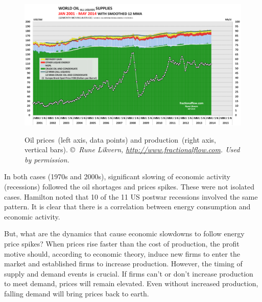 \begin{figure}[!ht]
\centering\
\includegraphics[width=\linewidth]{Part_0/Chapter_Introduction/images/WORLD_ALL_LIQUIDS_MAY_2014.png}
\caption[Oil prices and production)]{Oil prices~(left axis, data points) and production~(right axis, vertical bars). 
\copyright~\emph{Rune Likvern, {\scriptsize \emph{\url{http://www.fractionalflow.com}}}. Used by permission.}}
\label{fig:oils_prices_and_production}
\end{figure}

In both cases (1970s and 2000s), 
significant slowing of economic activity (recessions)
followed the oil shortages and prices spikes.
These were not isolated cases.
Hamilton noted that 
10 of the 11 US postwar recessions 
involved the same pattern.\cite[p.~45]{Hamilton:2013vc}
It is clear that 
there is a correlation between energy consumption and economic activity.

But, what are the dynamics that cause economic slowdowns 
to follow energy price spikes?
When prices rise faster than the cost of production, 
the profit motive should, according to economic theory, induce 
new firms to enter the market and
established firms to increase production.
However, the timing of supply and demand events is crucial.
If firms can't or don't increase production to meet demand, 
prices will remain elevated.
Even without increased production, falling demand will 
bring prices back to earth.

